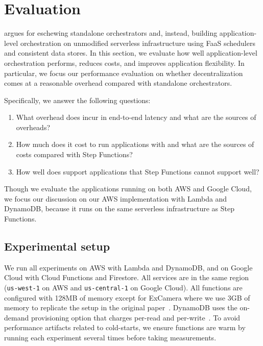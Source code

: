 \section{Evaluation}\label{sec:eval}

\name{} argues for eschewing standalone orchestrators and, instead, building
application-level orchestration on unmodified serverless infrastructure using
FaaS schedulers and consistent data stores. In this section, we evaluate how
well application-level orchestration performs, reduces costs, and improves
application flexibility. In particular, we focus our performance evaluation on
whether decentralization comes at a reasonable overhead compared with
standalone orchestrators.

Specifically, we answer the following questions:

\begin{enumerate}

  \item What overhead does \name{} incur in end-to-end latency and what are
   the sources of  overheads?

  \item How much does it cost to run applications with \name{} and what are
   the sources of costs compared with Step Functions?

  \item How well does \name{} support applications that Step Functions cannot
   support well?

\end{enumerate}

Though we evaluate the applications running on both AWS and Google Cloud, we
focus our discussion on our AWS implementation with Lambda and DynamoDB,
because it runs on the same serverless infrastructure as Step Functions.

\subsection{Experimental setup}

We run all experiments on AWS with Lambda and DynamoDB, and on Google Cloud
with Cloud Functions and Firestore. All services are in the same region
(\texttt{us-west-1} on AWS and \texttt{us-central-1} on Google Cloud). All
functions are configured with 128MB of memory except for ExCamera where we use
3GB of memory to replicate the setup in the original paper~\cite {excamera,
gg-atc}. DynamoDB uses the on-demand provisioning option that charges per-read
and per-write~\cite {dynamodb-pricing}. To avoid performance artifacts related
to cold-starts, we ensure functions are warm by running each experiment
several times before taking measurements.

